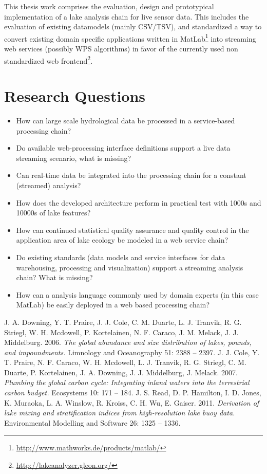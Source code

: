 \documentclass[paper=a4,fontsize=11pt]{scrartcl}
\newcommand{\fu}[1]{\footnote{\url{#1}}}
\begin{document}
    This thesis work comprises the evaluation, design and prototypical implementation of a lake analysis chain for live sensor data.
    This includes the evaluation of existing datamodels (mainly CSV/TSV), and standardized a way to convert existing domain specific applications written in MatLab\fu{http://www.mathworks.de/products/matlab/} into streaming web services (possibly WPS algorithms) in favor of the currently used non standardized web frontend\fu{http://lakeanalyzer.gleon.org/}.

    \section*{Research Questions}
    \begin{itemize}
        \item How can large scale hydrological data be processed in a service-based processing chain?
        \item Do available web-processing interface definitions support a live data streaming scenario, what is missing?
        \item Can real-time data be integrated into the processing chain for a constant (streamed) analysis?
        \item How does the developed architecture perform in practical test with 1000s and 10000s of lake features?
        \item How can continued statistical quality assurance and quality control in the application area of lake ecology be modeled in a web service chain?
        \item Do existing standards (data models and service interfaces for data warehousing, processing and visualization) support a streaming analysis chain? What is missing?
        \item How can a analysis language commonly used by domain experts (in this case MatLab) be easily deployed in a web based processing chain?
    \end{itemize}

    \clearpage
    \begin{thebibliography}{12}
            J. A. Downing, Y. T. Praire, J. J. Cole, C. M. Duarte, L. J. Tranvik, R. G. Striegl, W. H. Mcdowell, P. Kortelainen, N. F. Caraco, J. M. Melack, J. J. Middelburg.
            2006.
            \emph{The global abundance and size distribution of lakes, pounds, and impoundments.}
            Limnology and Oceanography 51: 2388 -- 2397.
            J. J. Cole, Y. T. Praire, N. F. Caraco, W. H. Mcdowell, L. J. Tranvik, R. G. Striegl, C. M. Duarte, P. Kortelainen, J. A. Downing, J. J. Middelburg, J. Melack.
            2007.
            \emph{Plumbing the global carbon cycle: Integrating inland waters into the terrestrial carbon budget.}
            Ecosystems 10: 171 -- 184.
            J. S. Read, D. P. Hamilton, I. D. Jones, K. Muraoka, L. A. Winslow, R. Kroiss, C. H. Wu, E. Gaiser.
            2011.
            \emph{Derivation of lake mixing and stratification indices from high-resolution lake buoy data.}
            Environmental Modelling and Software 26: 1325 -- 1336.
    \end{thebibliography}
\end{document}
